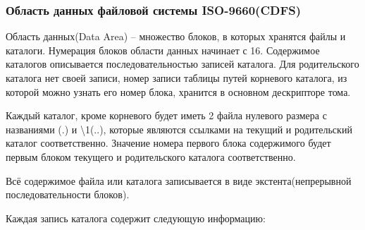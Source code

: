 \subsubsection{Область данных файловой системы ISO-9660(CDFS)}

Область данных(Data Area) -- множество блоков, в которых хранятся файлы и каталоги. Нумерация блоков области данных начинает с 16. Содержимое каталогов описывается последовательностью записей каталога. Для родительского каталога нет своей записи, номер записи таблицы путей корневого каталога, из которой можно узнать его номер блока, хранится в основном дескрипторе тома.

Каждый каталог, кроме корневого будет иметь 2 файла нулевого размера с названиями \textquotedbl\textquotedbl(\textquotedbl.\textquotedbl) и \textquotedbl\textbackslash1\textquotedbl(\textquotedbl..\textquotedbl), которые являются ссылками на текущий и родительский каталог соответственно. Значение номера первого блока содержимого будет первым блоком текущего и родительского каталога соответственно.

Всё содержимое файла или каталога записывается в виде экстента(непрерывной последовательности блоков).

Каждая запись каталога содержит следующую информацию:

